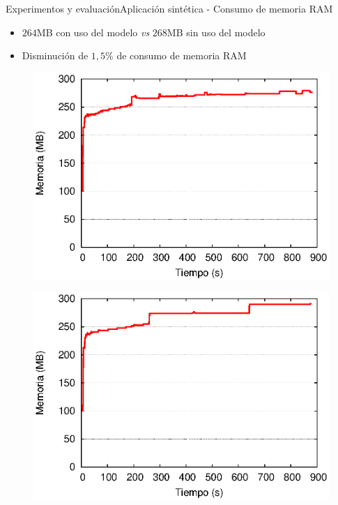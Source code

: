 \begin{frame}{Experimentos y evaluación}{Aplicación sintética - Consumo de memoria RAM}

\begin{itemize}
\item $264$MB con uso del modelo \textit{vs} $268$MB sin uso del modelo
\item Disminución de $1,5\%$ de consumo de memoria RAM
\end{itemize}

\begin{multicols}{2}
\begin{figure}[p]
	\centering
	\includegraphics[scale=0.475]{images/exp/app3/cm/fisical/consumeRAM.eps}
\end{figure}

\begin{figure}[p]
	\centering
	\includegraphics[scale=0.475]{images/exp/app3/sm/fisical/consumeRAM.eps}
\end{figure}
\end{multicols}
\end{frame}

